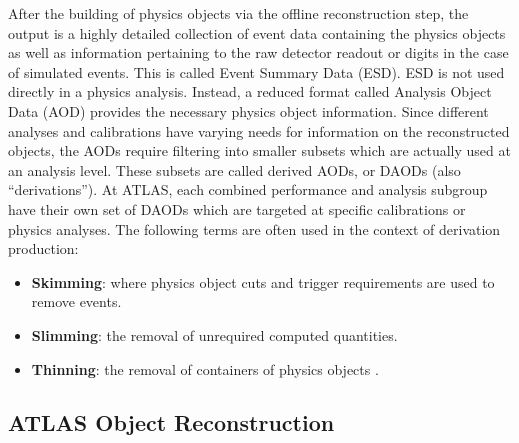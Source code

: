 After the building of physics objects via the offline reconstruction step, the output is a highly detailed collection of event data containing the physics objects as well as information pertaining to the raw detector readout or digits in the case of simulated events. This is called Event Summary Data (ESD). ESD is not used directly in a physics analysis. Instead, a reduced format called Analysis Object Data (AOD) provides the necessary physics object information. Since different analyses and calibrations have varying needs for information on the reconstructed objects, the AODs require filtering into smaller subsets which are actually used at an analysis level. These subsets are called derived AODs, or DAODs (also ``derivations''). At ATLAS, each combined performance and analysis subgroup have their own set of DAODs which are targeted at specific calibrations or physics analyses. The following terms are often used in the context of derivation production:
\begin{itemize}
    \item \textbf{Skimming}: where physics object cuts and trigger requirements are used to remove events.
    \item \textbf{Slimming}: the removal of unrequired computed quantities.
    \item \textbf{Thinning}: the removal of containers of physics objects \cite{Buckley:PCP}.
\end{itemize}


\subsection{ATLAS Object Reconstruction\label{sec:objreco}}

